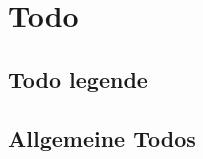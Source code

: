 



\chapter*{Todo}

\section*{Todo legende}
\unsure[]{[ unsure ]}

\change[]{[ change ]}

\info[]{[ info ]}

\improvement[]{[ improvement ]}

\todoist[]{[ todoist ]}

\section*{Allgemeine Todos}


